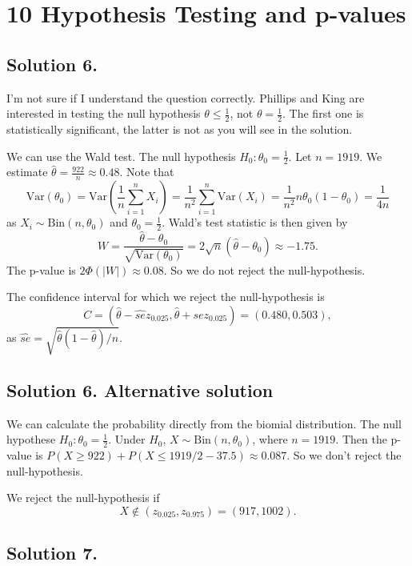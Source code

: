 \section*{10 Hypothesis Testing and p-values}

\subsection*{Solution 6.}

I'm not sure if I understand the question correctly.
Phillips and King are interested in testing the null hypothesis $\theta \leq \frac{1}{2}$, not $\theta = \frac{1}{2}$.
The first one is statistically significant, the latter is not as you will see in the solution.

We can use the Wald test.
The null hypothesis $H_0: \theta_0 = \frac{1}{2}$.
Let $n = 1919$.
We estimate $\hat{\theta} = \frac{922}{n} \approx 0.48$.
Note that
$$
\mathrm{Var}(\theta_0)
    = \mathrm{Var}(\frac{1}{n} \sum_{i=1}^n X_i)
    = \frac{1}{n^2} \sum_{i=1}^n \mathrm{Var}(X_i)
    = \frac{1}{n^2} n \theta_0 (1 - \theta_0)
    = \frac{1}{4n}
$$
as $X_i \sim \mathrm{Bin}(n, \theta_0)$ and $\theta_0 = \frac{1}{2}$.
Wald's test statistic is then given by
$$
W = \frac{\hat{\theta} - \theta_0}{\sqrt{\mathrm{Var}(\theta_0)}}
    = 2\sqrt{n} (\hat{\theta} - \theta_0)
    \approx -1.75.
$$
The p-value is $2\Phi(|W|) \approx 0.08$.
So we do not reject the null-hypothesis.

The confidence interval for which we reject the null-hypothesis is
$$
C = (\hat{\theta} - \hat{se} z_{0.025}, \hat{\theta} + \hat{se} z_{0.025})
    = (0.480, 0.503),
$$
as $\hat{se} = \sqrt{\hat{\theta}(1 - \hat{\theta})/n}$.

\subsection*{Solution 6. Alternative solution}

We can calculate the probability directly from the biomial distribution.
The null hypothese $H_0: \theta_0 = \frac{1}{2}$.
Under $H_0$, $X \sim \mathrm{Bin}(n, \theta_0)$, where $n = 1919$.
Then the p-value is $P(X \geq 922) + P(X \leq 1919/2 - 37.5) \approx 0.087$.
So we don't reject the null-hypothesis.

We reject the null-hypothesis if
$$
    X \notin (z_{0.025}, z_{0.975}) = (917, 1002).
$$


\subsection*{Solution 7.}

